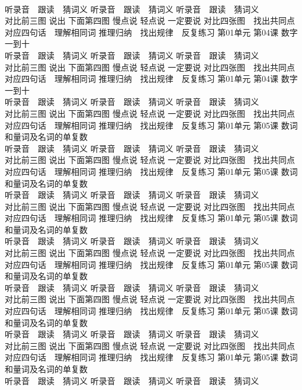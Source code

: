 \documentclass[8pt]{extreport}
\begin{document}
\begin{CJK}{UTF8}{min}
\\	听录音　跟读　猜词义 听录音　跟读　猜词义 听录音　跟读　猜词义 
\\	对比前三图 说出 下面第四图 慢点说 轻点说 一定要说	对比四张图　找出共同点 对应四句话　理解相同词 推理归纳　找出规律　反复练习 第01单元 第04课 数字一到十
\\	听录音　跟读　猜词义 听录音　跟读　猜词义 听录音　跟读　猜词义 
\\	对比前三图 说出 下面第四图 慢点说 轻点说 一定要说	对比四张图　找出共同点 对应四句话　理解相同词 推理归纳　找出规律　反复练习 第01单元 第04课 数字一到十
\\	听录音　跟读　猜词义 听录音　跟读　猜词义 听录音　跟读　猜词义 
\\	对比前三图 说出 下面第四图 慢点说 轻点说 一定要说	对比四张图　找出共同点 对应四句话　理解相同词 推理归纳　找出规律　反复练习 第01单元 第05课 数词和量词及名词的单复数
\\	听录音　跟读　猜词义 听录音　跟读　猜词义 听录音　跟读　猜词义 
\\	对比前三图 说出 下面第四图 慢点说 轻点说 一定要说	对比四张图　找出共同点 对应四句话　理解相同词 推理归纳　找出规律　反复练习 第01单元 第05课 数词和量词及名词的单复数
\\	听录音　跟读　猜词义 听录音　跟读　猜词义 听录音　跟读　猜词义 
\\	对比前三图 说出 下面第四图 慢点说 轻点说 一定要说	对比四张图　找出共同点 对应四句话　理解相同词 推理归纳　找出规律　反复练习 第01单元 第05课 数词和量词及名词的单复数
\\	听录音　跟读　猜词义 听录音　跟读　猜词义 听录音　跟读　猜词义 
\\	对比前三图 说出 下面第四图 慢点说 轻点说 一定要说	对比四张图　找出共同点 对应四句话　理解相同词 推理归纳　找出规律　反复练习 第01单元 第05课 数词和量词及名词的单复数
\\	听录音　跟读　猜词义 听录音　跟读　猜词义 听录音　跟读　猜词义 
\\	对比前三图 说出 下面第四图 慢点说 轻点说 一定要说	对比四张图　找出共同点 对应四句话　理解相同词 推理归纳　找出规律　反复练习 第01单元 第05课 数词和量词及名词的单复数
\\	听录音　跟读　猜词义 听录音　跟读　猜词义 听录音　跟读　猜词义 
\\	对比前三图 说出 下面第四图 慢点说 轻点说 一定要说	对比四张图　找出共同点 对应四句话　理解相同词 推理归纳　找出规律　反复练习 第01单元 第05课 数词和量词及名词的单复数
\\	听录音　跟读　猜词义 听录音　跟读　猜词义 听录音　跟读　猜词义 

\end{CJK}
\end{document}
